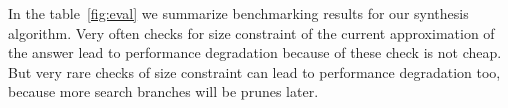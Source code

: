 In the table~\ref{fig:eval} we summarize benchmarking results for our synthesis algorithm.
Very often checks for size constraint of the current approximation of the answer lead to performance degradation
because of these check is not cheap. But very rare checks of size constraint can lead to performance degradation too,
because more search branches will be prunes later.
